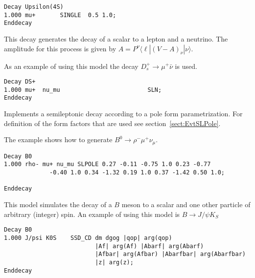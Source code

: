 \begin{verbatim}
Decay Upsilon(4S)
1.000 mu+       SINGLE  0.5 1.0;
Enddecay
\end{verbatim}


\label{sln}



\Expl
This decay generates the decay of a scalar to a lepton and a 
neutrino. The amplitude for this process is given by
$A=P^{\nu}\langle \ell | (V-A)_{\nu} | \nu \rangle$.

\Example 
As an example of using this model the decay $D_s^+\rightarrow \mu^+\bar\nu$
is used.
\begin{verbatim}
Decay DS+
1.000 mu+  nu_mu                         SLN;
Enddecay
\end{verbatim}




\label{SLPOLE}



\Expl
Implements a semileptonic decay according to a pole form parametrization.
For definition of the form factors that are used see 
section~\ref{sect:EvtSLPole}.
 
\Example
The example shows how to generate $B^0\rightarrow \rho^- \mu^+ \nu_{\mu}$.
\begin{verbatim}
Decay B0
1.000 rho- mu+ nu_mu SLPOLE 0.27 -0.11 -0.75 1.0 0.23 -0.77 
             -0.40 1.0 0.34 -1.32 0.19 1.0 0.37 -1.42 0.50 1.0;

Enddecay
\end{verbatim}







\label{ssdcp}



\Expl
This model simulates the decay of a $B$ meson to a scalar and
one other particle of arbitrary (integer) spin.
An example of using this model is $B\to J/\psi K_S$
\begin{verbatim}
Decay B0
1.000 J/psi K0S    SSD_CD dm dgog |qop| arg(qop) 
                          |Af| arg(Af) |Abarf| arg(Abarf) 
                          |Afbar| arg(Afbar) |Abarfbar| arg(Abarfbar)
                          |z| arg(z);
Enddecay
\end{verbatim}

